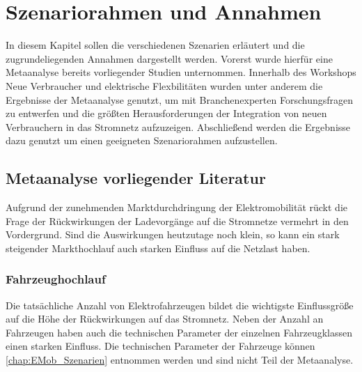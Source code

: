 
\section{Szenariorahmen und Annahmen}\label{chap:Szenariorahmen}

In diesem Kapitel sollen die verschiedenen Szenarien erläutert und die zugrundeliegenden Annahmen dargestellt werden.
Vorerst wurde hierfür eine Metaanalyse bereits vorliegender Studien unternommen.
Innerhalb des Workshops \glqq Neue Verbraucher und elektrische Flexbilitäten\grqq{} wurden unter anderem die Ergebnisse der Metaanalyse genutzt, um mit Branchenexperten Forschungsfragen zu entwerfen und die größten Herausforderungen der Integration von neuen Verbrauchern in das Stromnetz aufzuzeigen.
Abschließend werden die Ergebnisse dazu genutzt um einen geeigneten Szenariorahmen aufzustellen.

\subsection{Metaanalyse vorliegender Literatur}\label{chap:Metaanalyse}

Aufgrund der zunehmenden Marktdurchdringung der Elektromobilität rückt die Frage der Rückwirkungen der Ladevorgänge auf die Stromnetze vermehrt in den Vordergrund.
Sind die Auswirkungen heutzutage noch klein, so kann ein stark steigender Markthochlauf auch starken Einfluss auf die Netzlast haben.

\subsubsection{Fahrzeughochlauf}

Die tatsächliche Anzahl von Elektrofahrzeugen bildet die wichtigste Einflussgröße auf die Höhe der Rückwirkungen auf das Stromnetz.
Neben der Anzahl an Fahrzeugen haben auch die technischen Parameter der einzelnen Fahrzeugklassen einen starken Einfluss.
Die technischen Parameter der Fahrzeuge können \autoref{chap:EMob_Szenarien} entnommen werden und sind nicht Teil der Metaanalyse.



